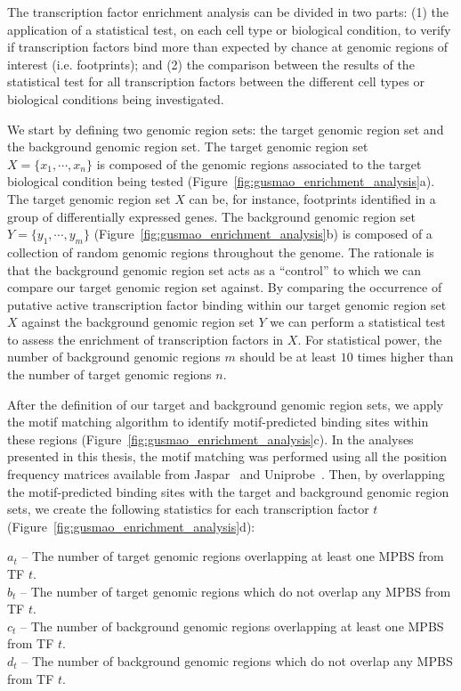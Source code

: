 The transcription factor enrichment analysis can be divided in two parts: (1) the application of a statistical test, on each cell type or biological condition, to verify if transcription factors bind more than expected by chance at genomic regions of interest (i.e. footprints); and (2) the comparison between the results of the statistical test for all transcription factors between the different cell types or biological conditions being investigated.

We start by defining two genomic region sets: the target genomic region set and the background genomic region set. The target genomic region set $X = \{ x_1, \cdots, x_n \}$ is composed of the genomic regions associated to the target biological condition being tested (Figure~\ref{fig:gusmao_enrichment_analysis}a). The target genomic region set $X$ can be, for instance, footprints identified in a group of differentially expressed genes. The background genomic region set $Y = \{ y_1, \cdots, y_m \}$ (Figure~\ref{fig:gusmao_enrichment_analysis}b) is composed of a collection of random genomic regions throughout the genome. The rationale is that the background genomic region set acts as a ``control'' to which we can compare our target genomic region set against. By comparing the occurrence of putative active transcription factor binding within our target genomic region set $X$ against the background genomic region set $Y$ we can perform a statistical test to assess the enrichment of transcription factors in $X$. For statistical power, the number of background genomic regions $m$ should be at least $10$ times higher than the number of target genomic regions $n$.

After the definition of our target and background genomic region sets, we apply the motif matching algorithm to identify motif-predicted binding sites within these regions (Figure~\ref{fig:gusmao_enrichment_analysis}c). In the analyses presented in this thesis, the motif matching was performed using all the position frequency matrices available from Jaspar~\cite{mathelier2014} and Uniprobe~\cite{robasky2011}. Then, by overlapping the motif-predicted binding sites with the target and background genomic region sets, we create the following statistics for each transcription factor $t$ (Figure~\ref{fig:gusmao_enrichment_analysis}d):

\vspace{0.3cm}
\noindent
$a_t$ -- The number of target genomic regions overlapping at least one MPBS from TF $t$. \vspace{0.2cm} \\
$b_t$ -- The number of target genomic regions which do not overlap any MPBS from TF $t$. \vspace{0.2cm} \\
$c_t$ -- The number of background genomic regions overlapping at least one MPBS from TF $t$. \vspace{0.2cm} \\
$d_t$ -- The number of background genomic regions which do not overlap any MPBS from TF $t$.\\
\vspace{0.3cm}

